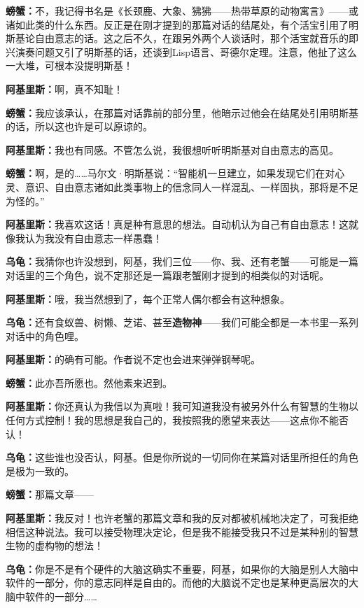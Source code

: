\documentclass[
  12pt,
  twoside,
  openright,
  oldfontcommands,
]{memoir}
\newcommand{\heititext}[1]{{\sffamily\bfseries #1}}
\newcommand{\dialogname}[1]{{\sffamily\bfseries #1}}
\begin{document}
\dialogname{螃蟹：}不，我记得书名是《长颈鹿、大象、狒狒------热带草原的动物寓言》------或诸如此类的什么东西。反正是在刚才提到的那篇对话的结尾处，有个活宝引用了明斯基论自由意志的话。这之后不久，在跟另外两个人谈话时，那个活宝就音乐的即兴演奏问题又引了明斯基的话，还谈到Lisp语言、哥德尔定理。注意，他扯了这么一大堆，可根本没提明斯基！

\dialogname{阿基里斯：}啊，真不知耻！

\dialogname{螃蟹：}我应该承认，在那篇对话靠前的部分里，他暗示过他会在结尾处引用明斯基的话，所以这也许是可以原谅的。

\dialogname{阿基里斯：}我也有同感。不管怎么说，我很想听听明斯基对自由意志的高见。

\dialogname{螃蟹：}啊，是的\ldots\ldots 马尔文·明斯基说：``智能机一旦建立，如果发现它们在对心灵、意识、自由意志诸如此类事物上的信念同人一样混乱、一样固执，那将是不足为怪的。''

\dialogname{阿基里斯：}我喜欢这话！真是种有意思的想法。自动机认为自己有自由意志！这就像我认为我没有自由意志一样愚蠢！

\dialogname{乌龟：}我猜你也许没想到，阿基，我们三位------你、我、还有老蟹------可能是一篇对话里的三个角色，说不定那还是一篇跟老蟹刚才提到的相类似的对话呢。

\dialogname{阿基里斯：}哦，我当然想到了，每个正常人偶尔都会有这种想象。

\dialogname{乌龟：}还有食蚁兽、树懒、芝诺、甚至\heititext{造物神}------我们可能全都是一本书里一系列对话中的角色哩。

\dialogname{阿基里斯：}的确有可能。作者说不定也会进来弹弹钢琴呢。

\dialogname{螃蟹：}此亦吾所愿也。然他素来迟到。

\dialogname{阿基里斯：}你还真认为我信以为真啦！我可知道我没有被另外什么有智慧的生物以任何方式控制！我的思想是我自己的，我按照我的愿望来表达------这点你不能否认！

\dialogname{乌龟：}这些谁也没否认，阿基。但是你所说的一切同你在某篇对话里所担任的角色是极为一致的。

\dialogname{螃蟹：}那篇文章------

\dialogname{阿基里斯：}我反对！也许老蟹的那篇文章和我的反对都被机械地决定了，可我拒绝相信这种说法。我可以接受物理决定论，但是我不能接受我只不过是某种别的智慧生物的虚构物的想法！

\dialogname{乌龟：}你是不是有个硬件的大脑这确实不重要，阿基，如果你的大脑是别人大脑中软件的一部分，你的意志同样是自由的。而他的大脑说不定也是某种更高层次的大脑中软件的一部分\ldots\ldots{}
\end{document}
